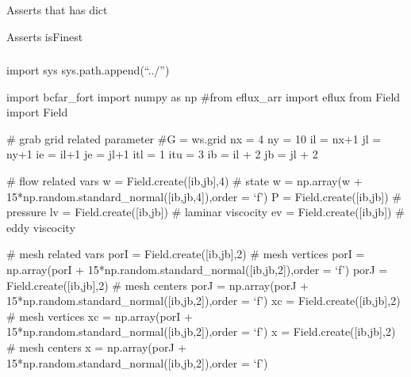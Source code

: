 \documentclass[letterpaper,10pt,english]{sphinxmanual}
\begin{document}
\begin{fulllineitems}
\label{\detokenize{autoapi/tests/test_Workspace/index:tests.test_Workspace.test_has_dict}}
\sphinxAtStartPar
Asserts that has dict

\end{fulllineitems}


\begin{fulllineitems}
\label{\detokenize{autoapi/tests/test_Workspace/index:tests.test_Workspace.test_finest}}
\sphinxAtStartPar
Asserts isFinest

\end{fulllineitems}



\subsubsection{}
\label{\detokenize{autoapi/tests/test_bcfar/index:module-tests.test_bcfar}}\label{\detokenize{autoapi/tests/test_bcfar/index:tests-test-bcfar}}\label{\detokenize{autoapi/tests/test_bcfar/index::doc}}
\sphinxAtStartPar
import sys
sys.path.append(“../”)

\sphinxAtStartPar
import bcfar\_fort
import numpy as np
\#from eflux\_arr import eflux
from Field import Field

\sphinxAtStartPar
\# grab grid related parameter
\#G = ws.grid
nx = 4
ny = 10
il = nx+1
jl = ny+1
ie = il+1
je = jl+1
itl = 1
itu = 3
ib = il + 2
jb = jl + 2

\sphinxAtStartPar
\# flow related vars
w = Field.create({[}ib,jb{]},4) \# state
w = np.array(w + 15*np.random.standard\_normal({[}ib,jb,4{]}),order = ‘f’)
P = Field.create({[}ib,jb{]}) \# pressure
lv = Field.create({[}ib,jb{]}) \# laminar viscocity
ev = Field.create({[}ib,jb{]}) \# eddy viscocity

\sphinxAtStartPar
\# mesh related vars
porI = Field.create({[}ib,jb{]},2) \# mesh vertices
porI = np.array(porI + 15*np.random.standard\_normal({[}ib,jb,2{]}),order = ‘f’)
porJ = Field.create({[}ib,jb{]},2) \# mesh centers
porJ = np.array(porJ + 15*np.random.standard\_normal({[}ib,jb,2{]}),order = ‘f’)
xc = Field.create({[}ib,jb{]},2) \# mesh vertices
xc = np.array(porI + 15*np.random.standard\_normal({[}ib,jb,2{]}),order = ‘f’)
x = Field.create({[}ib,jb{]},2) \# mesh centers
x = np.array(porJ + 15*np.random.standard\_normal({[}ib,jb,2{]}),order = ‘f’)
\end{document}
